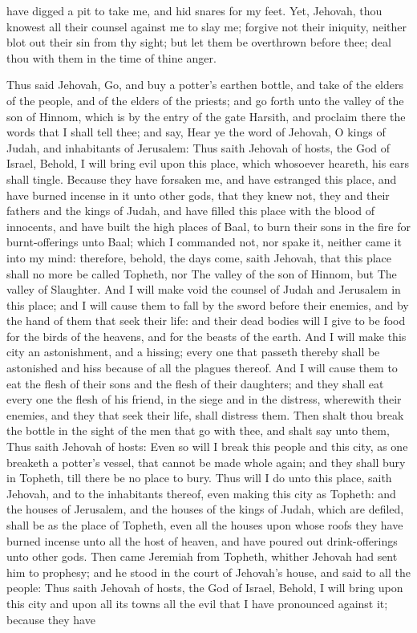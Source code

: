 have digged a pit to take me, and hid snares for my feet. Yet, Jehovah, thou knowest all their counsel against me to slay me; forgive not their iniquity, neither blot out their sin from thy sight; but let them be overthrown before thee; deal thou with them in the time of thine anger. 

Thus said Jehovah, Go, and buy a potter’s earthen bottle, and take of the elders of the people, and of the elders of the priests; and go forth unto the valley of the son of Hinnom, which is by the entry of the gate Harsith, and proclaim there the words that I shall tell thee; and say, Hear ye the word of Jehovah, O kings of Judah, and inhabitants of Jerusalem: Thus saith Jehovah of hosts, the God of Israel, Behold, I will bring evil upon this place, which whosoever heareth, his ears shall tingle. Because they have forsaken me, and have estranged this place, and have burned incense in it unto other gods, that they knew not, they and their fathers and the kings of Judah, and have filled this place with the blood of innocents, and have built the high places of Baal, to burn their sons in the fire for burnt-offerings unto Baal; which I commanded not, nor spake it, neither came it into my mind: therefore, behold, the days come, saith Jehovah, that this place shall no more be called Topheth, nor The valley of the son of Hinnom, but The valley of Slaughter. And I will make void the counsel of Judah and Jerusalem in this place; and I will cause them to fall by the sword before their enemies, and by the hand of them that seek their life: and their dead bodies will I give to be food for the birds of the heavens, and for the beasts of the earth. And I will make this city an astonishment, and a hissing; every one that passeth thereby shall be astonished and hiss because of all the plagues thereof. And I will cause them to eat the flesh of their sons and the flesh of their daughters; and they shall eat every one the flesh of his friend, in the siege and in the distress, wherewith their enemies, and they that seek their life, shall distress them.  Then shalt thou break the bottle in the sight of the men that go with thee, and shalt say unto them, Thus saith Jehovah of hosts: Even so will I break this people and this city, as one breaketh a potter’s vessel, that cannot be made whole again; and they shall bury in Topheth, till there be no place to bury. Thus will I do unto this place, saith Jehovah, and to the inhabitants thereof, even making this city as Topheth: and the houses of Jerusalem, and the houses of the kings of Judah, which are defiled, shall be as the place of Topheth, even all the houses upon whose roofs they have burned incense unto all the host of heaven, and have poured out drink-offerings unto other gods.  Then came Jeremiah from Topheth, whither Jehovah had sent him to prophesy; and he stood in the court of Jehovah’s house, and said to all the people: Thus saith Jehovah of hosts, the God of Israel, Behold, I will bring upon this city and upon all its towns all the evil that I have pronounced against it; because they have 